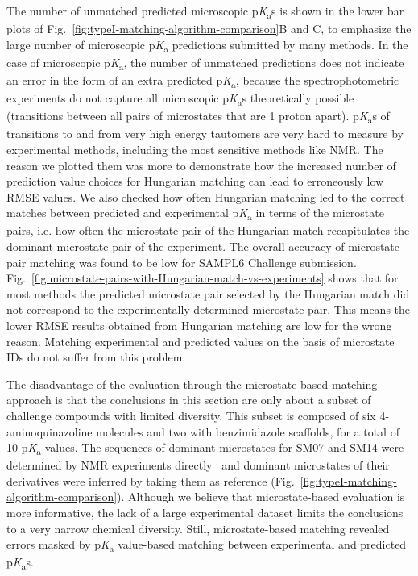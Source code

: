 \documentclass[9pt,lineno,final]{elife}
\newcommand{\pKa}{p\textit{K}\textsubscript{a}}
\begin{document}
The number of unmatched predicted microscopic \pKa{s} is shown in the lower bar plots of Fig.~\ref{fig:typeI-matching-algorithm-comparison}B and C, to emphasize the large number of microscopic \pKa{} predictions submitted by many methods. 
In the case of microscopic \pKa{}, the number of unmatched predictions does not indicate an error in the form of an extra predicted \pKa{}, because the spectrophotometric experiments do not capture all microscopic \pKa{}s theoretically possible (transitions between all pairs of microstates that are 1 proton apart). 
\pKa{}s of transitions to and from very high energy tautomers are very hard to measure by experimental methods, including the most sensitive methods like NMR. 
The reason we plotted them was more to demonstrate how the increased number of prediction value choices for Hungarian matching can lead to erroneously low RMSE values. 
We also checked how often Hungarian matching led to the correct matches between predicted and experimental \pKa{} in terms of the microstate pairs, i.e. how often the microstate pair of the Hungarian match recapitulates the dominant microstate pair of the experiment. The overall accuracy of microstate pair matching was found to be low for SAMPL6 Challenge submission. 
Fig.~\ref{fig:microstate-pairs-with-Hungarian-match-vs-experiments} shows that for most methods the predicted microstate pair selected by the Hungarian match did not correspond to the experimentally determined microstate pair.
This means the lower RMSE results obtained from Hungarian matching are low for the wrong reason. 
Matching experimental and predicted values on the basis of microstate IDs do not suffer from this problem.  

The disadvantage of the evaluation through the microstate-based matching approach is that the conclusions in this section are only about a subset of challenge compounds with limited diversity. This subset is composed of six 4-aminoquinazoline molecules and two  with benzimidazole scaffolds, for a total of 10 \pKa{} values. The sequences of dominant microstates for SM07 and SM14 were determined by NMR experiments directly~\citep{Isik:2018:J.Comput.AidedMol.Des.} and dominant microstates of their derivatives were inferred by taking them as reference (Fig.~\ref{fig:typeI-matching-algorithm-comparison}). Although we believe that microstate-based evaluation is more informative, the lack of a large experimental dataset limits the conclusions to a very narrow chemical diversity. Still, microstate-based matching revealed errors masked by \pKa{} value-based matching between experimental and predicted \pKa{}s.
\end{document}
